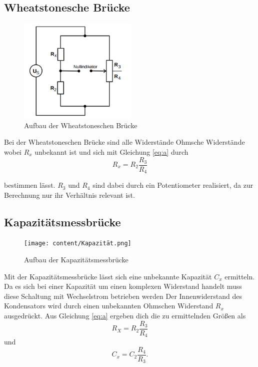 \subsection{Wheatstonesche Brücke}
\begin{figure}[H]
\centering
    \includegraphics[height= 5cm]{content/Wheatstone.png}
    \caption{Aufbau der Wheatstoneschen Brücke\cite[219]{sample}}
\end{figure}
\noindent Bei der Wheatstoneschen Brücke sind alle
Widerstände Ohmsche Widerstände wobei $R_x$ unbekannt
ist und sich mit Gleichung \ref{eq:a} durch
\begin{equation}
    R_x=R_2\frac{R_3}{R_4}
\end{equation}

\noindent bestimmen lässt. $R_3$ und $R_4$ sind dabei
durch ein Potentiometer realisiert, da zur Berechnung
nur ihr Verhältnis relevant ist.


\subsection{Kapazitätsmessbrücke}
\label{sec:Kap}
\begin{figure}[H]
\centering
    \texttt{[image: content/Kapazität.png]}
    \caption{Aufbau der Kapazitätsmessbrücke\cite[220]{sample}}
\end{figure}
\noindent Mit der Kapazitätsmessbrücke lässt sich eine
unbekannte Kapazität $C_x$ ermitteln. Da es sich
bei einer Kapazität um einen komplexen Widerstand handelt
muss diese Schaltung mit Wechselstrom betrieben werden
Der Innenwiderstand des Kondensators wird durch einen
unbekannten Ohmschen Widerstand $R_x$ ausgedrückt.
Aus Gleichung \ref{eq:a} ergeben dich die zu ermittelnden
Größen als
\begin{equation}
    R_X=R_2\frac{R_3}{R_4}
\end{equation}
\noindent und
\begin{equation}
    C_x=C_2\frac{R_4}{R_3}.
\end{equation}




